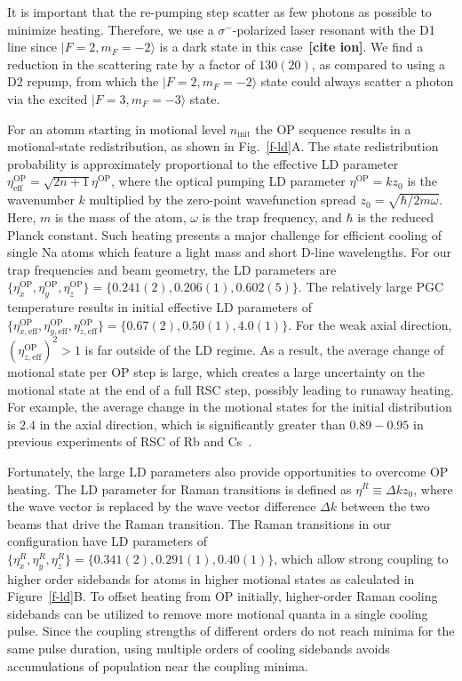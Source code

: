 \documentclass[aps,prl,twocolumn,groupedaddress]{revtex4-1}
\newcommand{\fxnote}[1]{{\textbf{[#1]}}}
\begin{document}
It is important that the re-pumping step scatter as few photons as possible to minimize heating.
Therefore, we use a $\sigma^-$-polarized laser resonant with the D1 line
since $|F=2, m_F=-2\rangle$ is a dark state in this case~\cite{Grobner2017}\fxnote{cite ion}.
We find a reduction in the scattering rate by a factor of $130(20)$,
as compared to using a D2 repump, from which the $|F=2, m_F=-2\rangle$ state
could always scatter a photon via the excited $|F=3, m_F=-3\rangle$ state.

For an atomm starting in motional level $n_{\textrm{init}}$ the OP sequence results in
a motional-state redistribution, as shown in Fig.~\ref{f-ld}A.
The state redistribution probability is approximately proportional to the effective LD parameter
$\eta^{\textrm{OP}}_{\textrm{eff}}=\sqrt{2n+1}\eta^{\textrm{OP}}$,
where the optical pumping LD parameter $\eta^{\textrm{OP}} = kz_0$ is the wavenumber $k$
multiplied by the zero-point wavefunction spread $z_0 = \sqrt{\hbar/2m\omega}$.
Here, $m$ is the mass of the atom, $\omega$ is the trap frequency,
and $\hbar$ is the reduced Planck constant.
Such heating presents a major challenge for efficient cooling of single Na atoms
which feature a light mass and short D-line wavelengths.
For our trap frequencies and beam geometry, the LD parameters are
$\{\eta^{\textrm{OP}}_x,\eta^{\textrm{OP}}_y,\eta^{\textrm{OP}}_z\} = \{0.241(2), 0.206(1), 0.602(5)\}$.
The relatively large PGC temperature results in initial effective LD parameters of
$\{\eta^{\textrm{OP}}_{x,\textrm{eff}},\eta^{\textrm{OP}}_{y,\textrm{eff}},\eta^{\textrm{OP}}_{z,\textrm{eff}}\} = \{0.67(2), 0.50(1), 4.0(1)\}$.
For the weak axial direction, $(\eta^{\textrm{OP}}_{z,\textrm{eff}})^2>1$ is far outside of the LD regime.
As a result, the average change of motional state per OP step is large,
which creates a large uncertainty on the motional state at the end of a full RSC step, possibly leading to runaway heating.
For example, the average change in the motional states for the initial distribution
is $2.4$ in the axial direction, which is significantly greater than $0.89-0.95$
in previous experiments of RSC of Rb and Cs~\cite{Li2012,Kaufman2012,Thompson2013,Liu2017}.

Fortunately, the large LD parameters also provide opportunities to overcome OP heating.
The LD parameter for Raman transitions is defined as $\eta^R\equiv\Delta k z_0$,
where the wave vector is replaced by the wave vector difference $\Delta k$
between the two beams that drive the Raman transition.
The Raman transitions in our configuration have LD parameters of
$\{\eta^R_x,\eta^R_y,\eta^R_z\} = \{0.341(2), 0.291(1), 0.40(1)\}$,
which allow strong coupling to higher order sidebands for atoms in higher motional states
as calculated in Figure~\ref{f-ld}B.
To offset heating from OP initially, higher-order Raman cooling sidebands can be utilized
to remove more motional quanta in a single cooling pulse.
Since the coupling strengths of different orders do not reach minima for the same pulse duration,
using multiple orders of cooling sidebands avoids accumulations of population
near the coupling minima.
\end{document}
